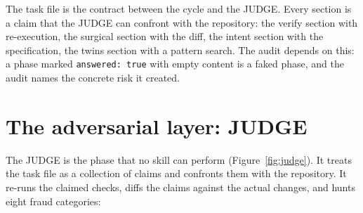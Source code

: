 \documentclass{sbc2019}%
\begin{document}
The task file is the contract between the cycle and the JUDGE. Every
section is a claim that the JUDGE can confront with the repository: the
verify section with re-execution, the surgical section with the diff, the
intent section with the specification, the twins section with a pattern
search. The audit depends on this: a phase marked
\texttt{answered: true} with empty content is a faked phase, and the audit
names the concrete risk it created.

\section{The adversarial layer: JUDGE}
\label{sec:judge}

The JUDGE is the phase that no skill can perform (Figure~\ref{fig:judge}). It treats the task file as
a collection of claims and confronts them with the repository. It re-runs
the claimed checks, diffs the claims against the actual changes, and hunts
eight fraud categories:
\end{document}
